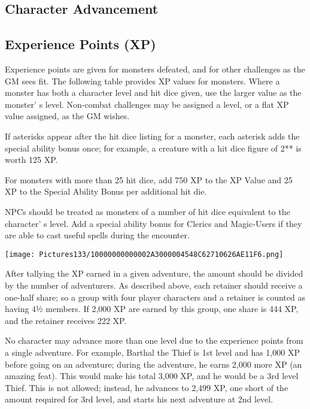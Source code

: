 \documentclass[a4paper,twoside,openany,10pt]{book}
\begin{document}
\subsection{Character Advancement}\label{character-advancement}

\begin{multicols}{2}

\subsection{Experience Points (XP)}\label{experience-points-xp}

Experience points are given for monsters defeated, and for other challenges as the GM sees fit. The following table provides XP values for monsters. Where a monster has both a character level and hit dice given, use the larger value as the monster' s level. Non-combat challenges may be assigned a level, or a flat XP value assigned, as the GM wishes.

If asterisks appear after the hit dice listing for a monster, each asterisk adds the special ability bonus once; for example, a creature with a hit dice figure of 2** is worth 125 XP.

For monsters with more than 25 hit dice, add 750 XP to the XP Value and 25 XP to the Special Ability Bonus per additional hit die. 

NPCs should be treated as monsters of a number of hit dice equivalent to the character' s level. Add a special ability bonus for Clerics and Magic-Users if they are able to cast useful spells during the encounter.


\begin{flushleft}
	\texttt{[image: Pictures133/10000000000002A3000004548C62710626AE11F6.png]}
\end{flushleft}

After tallying the XP earned in a given adventure, the amount should be divided by the number of adventurers. As described above, each retainer should receive a one-half share; so a group with four player characters and a retainer is counted as having 4½ members. If 2,000 XP are earned by this group, one share is 444 XP, and the retainer receives 222 XP. 

No character may advance more than one level due to the experience points from a single adventure. For example, Barthal the Thief is 1st level and has 1,000 XP before going on an adventure; during the adventure, he earns 2,000 more XP (an amazing feat). This would make his total 3,000 XP, and he would be a 3rd level Thief. This is not allowed; instead, he advances to 2,499 XP, one short of the amount required for 3rd level, and starts his next adventure at 2nd level.\\\medskip


\end{multicols}
\end{document}
